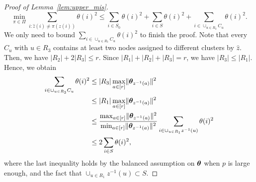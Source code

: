 \documentclass[journal]{IEEEtran}
\theoremstyle{definition}
\theoremstyle{definition}
\begin{document}
\begin{proof}[Proof of Lemma~\ref{lem:upper_mis}]
\vspace{-0.5cm}
\small
\begin{equation}
    \min_{\pi \in \Pi} \sum_{i : \hat z(i) \neq \pi(z(i))} \theta(i)^2 \leq \sum_{i \in S_0} \theta(i)^2 + \sum_{i \in S} \theta(i)^2 + \sum_{ i \in \cup_{u \in R_3} C_u} \theta(i)^2.
\end{equation}
\normalsize
 We only need to bound $\sum_{ i \in \cup_{u \in R_3} C_u} \theta(i)^2$ to finish the proof. Note that every $C_u$ with $u \in R_3$ contains at least two nodes assigned to different clusters by $\hat z$. Then, we have $|R_2| + 2 |R_3| \leq r$. Since $|R_1| + |R_2| + |R_3| = r$, we have $|R_3| \leq |R_1|$. Hence, we obtain
\begin{align}
    \sum_{ i \in \cup_{u \in R_3} C_u} \theta(i)^2 &\leq |R_3| \max_{a \in [r]} \lVert\boldsymbol{\theta}_{z^{-1}(a)}\rVert^2 \\
    & \leq |R_1| \max_{a \in [r]} \lVert\boldsymbol{\theta}_{z^{-1}(a)}\rVert^2  \\
    & \leq {\max_{a \in [r]} \lVert\boldsymbol{\theta}_{z^{-1}(a)}\rVert^2 \over \min_{a \in [r]} \lVert\boldsymbol{\theta}_{z^{-1}(a)}\rVert^2 } \sum_{i \in \cup_{u \in R_1} z^{-1}(u)} \theta(i)^2\\
    & \leq 2 \sum_{i \in S} \theta(i)^2,
\end{align}
where the last inequality holds by the balanced assumption on $\boldsymbol{\theta}$ when $p$ is large enough, and the fact that $ \cup_{u \in R_1} z^{-1}(u) \subset S$.
\end{proof}
\end{document}
